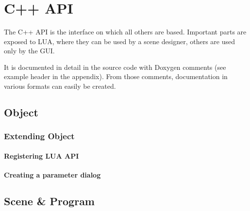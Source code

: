 \section{C++ API}
\paragraph{}
The C++ API is the interface on which all others are based.
Important parts are exposed to LUA, where they can be used by a scene designer, others are used only by the GUI.

It is documented in detail in the source code with Doxygen comments (see example header in the appendix).
From those comments, documentation in various formats can easily be created.

\subsection{Object}
\paragraph{}


\subsubsection{Extending Object}
\paragraph{}


\paragraph{Registering LUA API}


\paragraph{Creating a parameter dialog}


\subsection{Scene \& Program}
\paragraph{}


